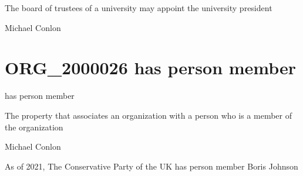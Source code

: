 \documentclass[letterpaper,10pt,english]{sphinxmanual}
\begin{document}
\begin{sphinxShadowBox}

\sphinxAtStartPar
The board of trustees of a university may appoint the university president
\end{sphinxShadowBox}

\begin{sphinxShadowBox}

\sphinxAtStartPar
Michael Conlon 
\end{sphinxShadowBox}
\begin{quote}
\label{\detokenize{doc-ORG_2000026:org-2000026}}\label{\detokenize{doc-ORG_2000026:has-person-member}}\label{\detokenize{doc-ORG_2000026:org-2000026}}
\ignorespaces \end{quote}


\section{ORG\_2000026 \sphinxhyphen{} has person member}
\label{\detokenize{doc-ORG_2000026:org-2000026-has-person-member}}\label{\detokenize{doc-ORG_2000026:index-0}}\label{\detokenize{doc-ORG_2000026::doc}}
\begin{sphinxShadowBox}

\sphinxAtStartPar
has person member
\end{sphinxShadowBox}

\begin{sphinxShadowBox}

\sphinxAtStartPar
The property that associates an organization with a person who is  a member of the organization
\end{sphinxShadowBox}

\begin{sphinxShadowBox}

\sphinxAtStartPar
Michael Conlon 
\end{sphinxShadowBox}

\begin{sphinxShadowBox}

\sphinxAtStartPar
As of 2021, The Conservative Party of the UK has person member Boris Johnson
\end{sphinxShadowBox}
\end{document}
